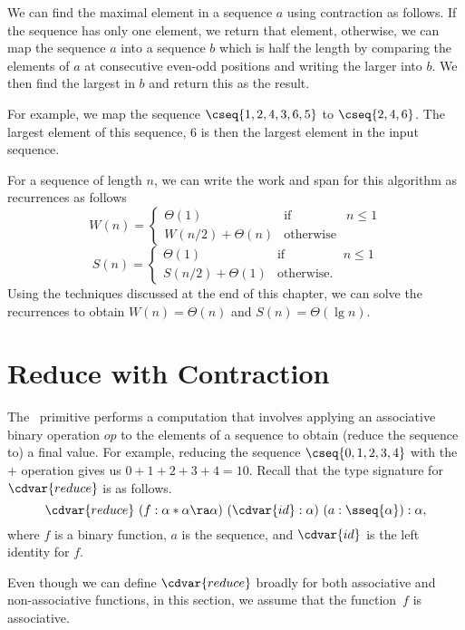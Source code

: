\begin{cluster}
\label{grp:xmpl:design::contraction::maximal-element}

\begin{example}
\label{xmpl:design::contraction::maximal-element}
We can find the maximal element in a sequence $a$ using contraction as
follows.
If the sequence has only one element, we return that element,
otherwise,
we can map the sequence $a$ into a sequence $b$ which is half the
length by comparing the elements of $a$ at consecutive even-odd
positions and writing the larger into $b$.
We then find the largest in $b$ and return this as the result.

For example, we map the sequence
$\cseq{1,2,4,3,6,5}$ 
to 
$\cseq{2,4,6}$.
The largest element of this sequence, $6$ is then the largest element
in the input sequence.

For a sequence of length $n$, we can write the work and span for this
algorithm as recurrences as follows
\[
W(n) = \left\{
\begin{array}{lll}
\Theta(1) & \mbox{if} & n \le 1
\\
W(n/2) + \Theta(n) &  \mbox{otherwise}
\end{array}
\right.
\]
\[
S(n) = \left\{
\begin{array}{lll}
\Theta(1) & \mbox{if} & n \le 1
\\
S(n/2) + \Theta(1) &  \mbox{otherwise}.
\end{array}
\right.
\]
Using the techniques discussed at the end of this chapter, we can solve
the recurrences to obtain $W(n) = \Theta(n)$ and $S(n) =
\Theta(\lg{n})$.

\end{example}
\end{cluster}


\section{Reduce with Contraction}
\label{sec:design::contraction::reduce}

\begin{cluster}
\label{grp:grm:design::contraction::reduce}

\begin{gram}
\label{grm:design::contraction::reduce}
The~ primitive performs a computation that involves
applying an associative binary operation $op$ to the elements of a
sequence to obtain (reduce the sequence to) a final value.
For example, reducing the sequence $\cseq{0,1,2,3,4}$ with the $+$
operation gives us $0 + 1 + 2 + 3 + 4 = 10$.
Recall that the type signature for~$\cdvar{reduce}$ is as follows.
\[
\cdvar{reduce}~(f: \alpha * \alpha \ra \alpha)~(\cdvar{id}: \alpha)~(a: \sseq{\alpha}): \alpha,
\]
where $f$ is a binary function, $a$ is the sequence, and $\cdvar{id}$
is the left identity for $f$.

Even though we can define $\cdvar{reduce}$ broadly for both associative
and non-associative functions, in this section, we assume that the
function~$f$ is associative.

\end{gram}
\end{cluster}

